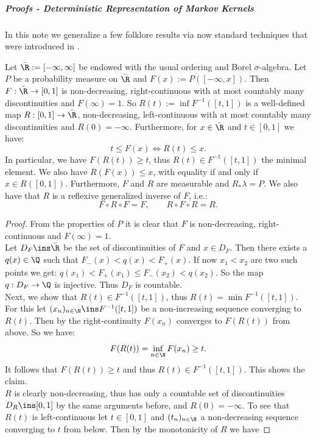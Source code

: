 \subparagraph{Proofs - Deterministic Representation of Markov Kernels }

In this note we generalize a few folklore results via now standard techniques that were introduced in \cite{Dar53}.

\begin{Lem}
\label{cdf}
Let $\bar\R := [-\infty,\infty]$ be endowed with the usual ordering and Borel $\sigma$-algebra.
Let $P$ be a probability measure on $\bar\R$  and $F(x):=P([-\infty,x])$.
Then $F: \bar\R \to [0,1]$ is non-decreasing, right-continuous with at most countably many discontinuities and $F(\infty)=1$.
So $R(t):= \inf F^{-1}([t,1])$ is a well-defined map $R: [0,1] \to \bar \R$, non-decreasing, left-continuous  with at most countably many discontinuities and $R(0)=-\infty$.
Furthermore, for $x \in \bar \R$ and $t \in [0,1]$ we have:
\[ t \le F(x) \iff R(t) \le x.  \] 
In particular, we have $F(R(t)) \ge t$, thus $R(t) \in F^{-1}([t,1])$ the minimal element. We also have $R(F(x)) \le x$,  with equality if and only if $x \in R([0,1])$.
Furthermore, $F$ and $R$ are measurable and $R_*\lambda=P$. %
We also have that $R$ is a reflexive generalized inverse of $F$, i.e.:
\[ F \circ R \circ F = F, \qquad R \circ F \circ R = R.\] 
\begin{proof}
    From the properties of $P$ it is clear that $F$ is non-decreasing, right-continuous and $F(\infty)=1$. \\
    Let $D_F \ins \bar\R$ be the set of discontinuities of $F$ and $x \in D_F$. Then there exists a $q(x) \in \Q$ such that $F_-(x)< q(x) < F_+(x)$. If now $x_1 < x_2$ are two such points we get:
    $q(x_1) < F_+(x_1) \le F_-(x_2) < q(x_2)$. So the map $q: D_F \to \Q$ is injective. Thus $D_F$ is countable.\\
    Next, we show that $R(t) \in F^{-1}([t,1])$, thus $R(t)= \min F^{-1}([t,1])$.
    For this let $(x_n)_{n \in \N}\ins F^{-1}([t,1])$ be a non-increasing sequence converging to $R(t)$. 
    Then by the right-continuity $F(x_n)$ converges to $F(R(t))$ from above. 
    So we have: \[F(R(t)) = \inf_{n \in \N} F(x_n) \ge t.\] 
    It follows that $F(R(t)) \ge t$ and thus $R(t) \in F^{-1}([t,1])$. This shows the claim.\\
    $R$ is clearly non-decreasing, thus has only a countable set of discontinuities $D_R \ins [0,1]$ by the same arguments before, and $R(0)=-\infty$. To see that $R(t)$ is left-continuous let $t \in [0,1]$ and $(t_n)_{n \in\N}$ a non-decreasing sequence converging to $t$ from below. Then by the monotonicity of $R$ we have

\end{proof}
\end{Lem}

